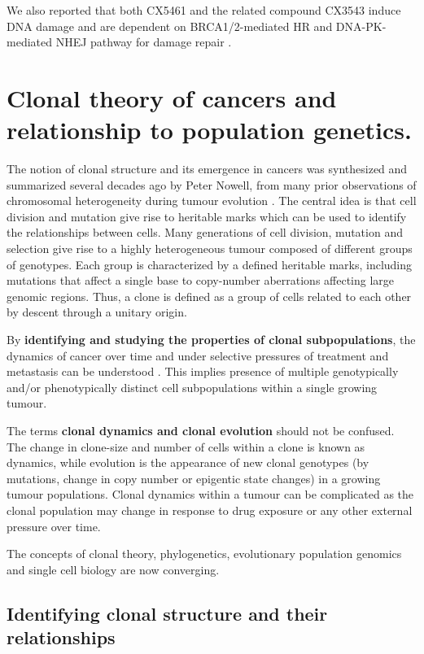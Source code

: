 We also reported that both CX5461 and the related compound CX3543 induce DNA damage and are dependent on BRCA1/2-mediated HR and DNA-PK-mediated NHEJ pathway for damage repair \cite{xu2017cx}.


\section{Clonal theory of cancers and relationship to population genetics.}
The notion of clonal structure and its emergence in cancers was synthesized and summarized several decades ago by Peter Nowell, from many prior observations of chromosomal heterogeneity during tumour evolution \cite{nowell1976clonal}. The central idea is that cell division and mutation give rise to heritable marks which can be used to identify the relationships between cells. Many generations of cell division, mutation and selection give rise to a highly heterogeneous tumour composed of different groups of genotypes. Each group is characterized by a defined heritable marks, including mutations that affect a single base to copy-number aberrations affecting large genomic regions. Thus, a clone is defined as a group of cells related to each other by descent through a unitary origin. 

By \textbf{identifying and studying the properties of clonal subpopulations}, the dynamics of cancer over time and under selective pressures of treatment and metastasis can be understood \cite{aparicio2013implications}. This implies presence of multiple genotypically and/or phenotypically distinct cell subpopulations within a single growing tumour.

The terms \textbf{clonal dynamics and clonal evolution} should not be confused. The change in clone-size and number of cells within a clone is known as dynamics, while evolution is the appearance of new clonal genotypes (by mutations, change in copy number or epigentic state changes) in a growing tumour populations. 
Clonal dynamics within a tumour can be complicated as the clonal population may change in response to drug exposure or any other external pressure over time.

The concepts of clonal theory, phylogenetics, evolutionary population genomics and single cell biology are now converging.


\subsection{Identifying clonal structure and their relationships}

